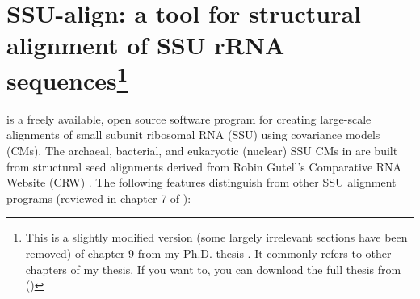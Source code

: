 \section[SSU-align: a tool for structural alignment of SSU
  rRNA sequences\protect\footnote{This is a slightly modified version 
  of chapter 9 from my Ph.D. thesis \cite{Nawrocki09b}}]
  {SSU-align: a tool for structural alignment of SSU
  rRNA sequences\protect\footnote{This is a slightly modified version
  (some largely irrelevant sections have been removed) 
  of chapter 9 from my Ph.D. thesis \cite{Nawrocki09b}. It commonly refers to other
  chapters of my thesis. If you want to, you can download the full thesis from 
  ()}}
\label{section:chap9}

 is a freely available, open source software program
for creating large-scale alignments of small subunit ribosomal RNA
(SSU) using covariance models (CMs). The archaeal, bacterial,
and eukaryotic (nuclear) 
SSU CMs in  are built from structural seed alignments derived from
Robin Gutell's Comparative RNA Website (CRW) \cite{CannoneGutell02}.
The following features distinguish  from other
SSU alignment programs (reviewed in chapter 7 of \cite{Nawrocki09b}):

